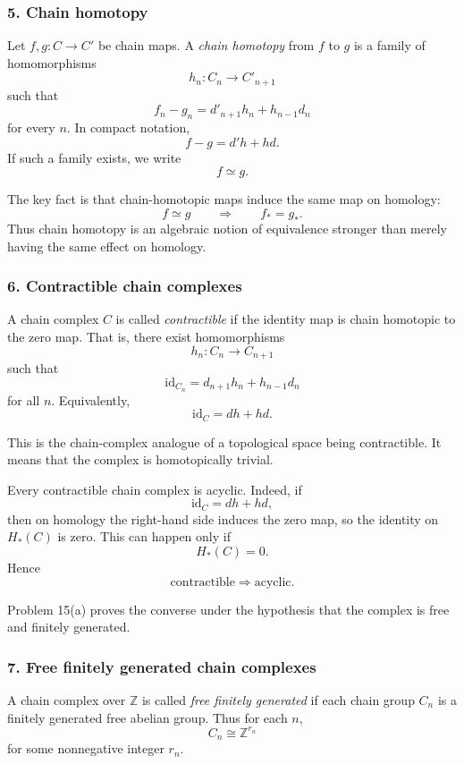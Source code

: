 \documentclass[12pt,a4paper]{article}
\theoremstyle{notespace}
\begin{document}
\subsubsection*{5. Chain homotopy}

Let \(f,g:C\to C'\) be chain maps. A \emph{chain homotopy} from \(f\) to \(g\) is a family of homomorphisms
\[
h_n:C_n\to C'_{n+1}
\]
such that
\[
f_n-g_n=d'_{n+1}h_n+h_{n-1}d_n
\]
for every \(n\). In compact notation,
\[
f-g=d'h+hd.
\]
If such a family exists, we write
\[
f\simeq g.
\]

The key fact is that chain-homotopic maps induce the same map on homology:
\[
f\simeq g \qquad \Longrightarrow \qquad f_*=g_*.
\]
Thus chain homotopy is an algebraic notion of equivalence stronger than merely having the same effect on homology.

\subsubsection*{6. Contractible chain complexes}

A chain complex \(C\) is called \emph{contractible} if the identity map is chain homotopic to the zero map. That is, there exist homomorphisms
\[
h_n:C_n\to C_{n+1}
\]
such that
\[
\mathrm{id}_{C_n}=d_{n+1}h_n+h_{n-1}d_n
\]
for all \(n\). Equivalently,
\[
\mathrm{id}_C=dh+hd.
\]

This is the chain-complex analogue of a topological space being contractible. It means that the complex is homotopically trivial.

Every contractible chain complex is acyclic. Indeed, if
\[
\mathrm{id}_C=dh+hd,
\]
then on homology the right-hand side induces the zero map, so the identity on \(H_*(C)\) is zero. This can happen only if
\[
H_*(C)=0.
\]
Hence
\[
\boxed{\text{contractible} \Longrightarrow \text{acyclic}.}
\]

Problem 15(a) proves the converse under the hypothesis that the complex is free and finitely generated.

\subsubsection*{7. Free finitely generated chain complexes}

A chain complex over \(\mathbb Z\) is called \emph{free finitely generated} if each chain group \(C_n\) is a finitely generated free abelian group. Thus for each \(n\),
\[
C_n\cong \mathbb Z^{r_n}
\]
for some nonnegative integer \(r_n\).
\end{document}
